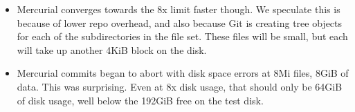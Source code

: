 \begin{itemize}
    \item Mercurial converges towards the 8x limit faster though. We speculate this
        is because of lower repo overhead, and also because Git is creating tree
        objects for each of the subdirectories in the file set. These files will
        be small, but each will take up another 4KiB block on the disk.

    \item Mercurial commits began to abort with disk space errors at 8Mi files,
        8GiB of data. This was surprising. Even at 8x disk usage, that should
        only be 64GiB of disk usage, well below the 192GiB free on the test
        disk.

\end{itemize}

%
